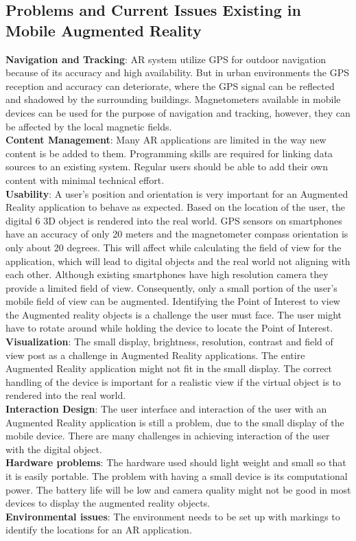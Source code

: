 \subsection{Problems and Current Issues Existing in Mobile Augmented Reality }
 \textbf{Navigation and Tracking}: AR system utilize GPS for outdoor navigation because of 
its accuracy and high availability. But in urban environments the GPS reception and 
accuracy can deteriorate, where the GPS signal can be reflected and shadowed by the 
surrounding buildings. Magnetometers available in mobile devices can be used for the 
purpose of navigation and tracking, however, they can be affected by the local magnetic 
fields. 
\\\textbf{Content Management}: Many AR applications are limited in the way new content is 
be added to them. Programming skills are required for linking data sources to an existing 
system. Regular users should be able to add their own content with minimal technical 
effort. 
\\\textbf{Usability}: A user’s position and orientation is very important for an Augmented 
Reality application to behave as expected. Based on the location of the user, the digital 
6 
3D object is rendered into the real world. GPS sensors on smartphones have an accuracy 
of only 20 meters and the magnetometer compass orientation is only about 20 degrees. 
This will affect while calculating the field of view for the application, which will lead to 
digital objects and the real world not aligning with each other. 
    Although existing smartphones have high resolution camera they provide a limited 
field of view. Consequently, only a small portion of the user’s mobile field of view can 
be augmented. Identifying the Point of Interest to view the Augmented reality objects is a 
challenge the user must face. The user might have to rotate around while holding the 
device to locate the Point of Interest. 
 \\\textbf{Visualization}: The small display, brightness, resolution, contrast and field of view 
post as a challenge in Augmented Reality applications. The entire Augmented Reality 
application might not fit in the small display. The correct handling of the device is 
important for a realistic view if the virtual object is to rendered into the real world. 
  \\\textbf{Interaction Design}: The user interface and interaction of the user with an Augmented 
Reality application is still a problem, due to the small display of the mobile device. There 
are many challenges in achieving interaction of the user with the digital object. 
 \\\textbf{Hardware problems}: The hardware used should light weight and small so that it is 
easily portable. The problem with having a small device is its computational power. The 
battery life will be low and camera quality might not be good in most devices to display 
the augmented reality objects. 
  \\\textbf{Environmental issues}: The environment needs to be set up with markings to identify 
the locations for an AR application. 
